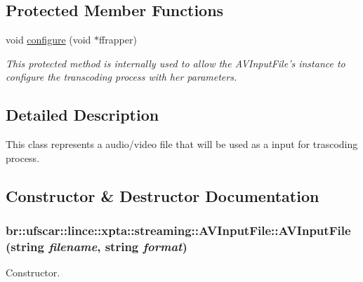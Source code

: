 \subsection*{Protected Member Functions}
\begin{DoxyCompactItemize}
\item 
void \hyperlink{classbr_1_1ufscar_1_1lince_1_1xpta_1_1streaming_1_1AVInputFile_afee89583e6231825a2282b9bb9860c07}{configure} (void $\ast$ffrapper)
\begin{DoxyCompactList}\small\item\em This protected method is internally used to allow the AVInputFile's instance to configure the transcoding process with her parameters. \item\end{DoxyCompactList}\end{DoxyCompactItemize}


\subsection{Detailed Description}
This class represents a audio/video file that will be used as a input for trascoding process. 

\subsection{Constructor \& Destructor Documentation}
\hypertarget{classbr_1_1ufscar_1_1lince_1_1xpta_1_1streaming_1_1AVInputFile_a7801f6e3ccb81fea42b18fd0a0177ff9}{
\subsubsection[{AVInputFile}]{\setlength{\rightskip}{0pt plus 5cm}br::ufscar::lince::xpta::streaming::AVInputFile::AVInputFile (string {\em filename}, \/  string {\em format})}}
\label{classbr_1_1ufscar_1_1lince_1_1xpta_1_1streaming_1_1AVInputFile_a7801f6e3ccb81fea42b18fd0a0177ff9}


Constructor. 


